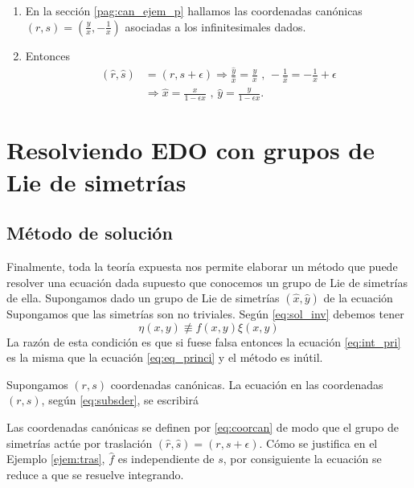 \begin{enumerate}
\item En la sección \ref{pag:can_ejem_p} hallamos las coordenadas canónicas $(r,s)=\left(\frac{y}{x},-\frac{1}{x}\right)$ asociadas a los infinitesimales dados.
\item Entonces
\[\begin{split}
(\hat{r},\hat{s})&=(r,s+\epsilon)\Rightarrow \frac{\hat{y}}{\hat{x}}=\frac{y}{x}\text{ , }-\frac{1}{\hat{x}}=-\frac{1}{x}+\epsilon\\
&\Rightarrow \hat{x}=\frac{x}{1-\epsilon x} \text{ , } \hat{y}=\frac{y}{1-\epsilon x}.
\end{split}
\] 
\end{enumerate}



\section{Resolviendo EDO con grupos de Lie de simetrías}
\subsection{Método de solución}
Finalmente, toda la teoría expuesta nos permite elaborar un método que puede resolver una ecuación dada supuesto que conocemos un grupo de Lie de simetrías de ella.  Supongamos dado  un grupo de Lie de simetrías $(\hat{x},\hat{y})$ de la ecuación
 Supongamos  que las simetrías son no triviales. Según \eqref{eq:sol_inv} debemos tener
 \[\eta(x,y)\not\equiv f(x,y)\xi(x,y)\]
La razón de esta condición es que si fuese falsa entonces la ecuación \eqref{eq:int_pri} es la misma que la ecuación \eqref{eq:eq_princi} y el método es inútil.

Supongamos $(r,s)$ coordenadas canónicas. La ecuación en las coordenadas $(r,s)$, según \eqref{eq:subsder}, se escribirá

Las coordenadas canónicas se definen por \eqref{eq:coorcan} de modo que el grupo de simetrías actúe por traslación $(\hat{r},\hat{s})=(r,s+\epsilon)$.
Cómo se justifica en el Ejemplo  \ref{ejem:tras}, $\hat{f}$ es independiente de $s$, por consiguiente la ecuación se reduce a
que se resuelve integrando.


